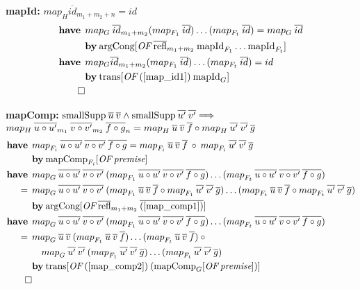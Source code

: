 \setcounter{mapId}{0}
\textbf{mapId:} $map_H \overline{id}_{m_1+m_2+n} = id$
\begin{align}
\textbf{have}\:\: & map_G \: \overline{id}_{m_1+m_2} (map_{F_1} \: \overline{id}) \dots (map_{F_t} \: \overline{id}) = map_G \: \overline{id} \label{map_id1} \\*
 & \textbf{by}\: \text{argCong}[\textit{OF} \: \overline{\text{refl}}_{m_1+m_2} \: \text{mapId}_{F_1} \dots \text{mapId}_{F_t}] \nonumber \\
\textbf{have}\:\: & map_G \overline{id}_{m_1+m_2} (map_{F_1} \: \overline{id}) \dots (map_{F_t} \: \overline{id}) = id \\*
& \textbf{by}\: \text{trans}[\textit{OF} \: (\ref{map_id1}) \: \text{mapId}_G] \nonumber \\*
\qed \nonumber
\end{align}

\textbf{mapComp:} $\text{smallSupp} \: \overline{u} \: \overline{v} \wedge \text{smallSupp} \: \overline{u'} \: \overline{v'} \Longrightarrow$ \\
\hspace*{1.7em} $map_H \: \overline{u \circ u'}_{m_1} \: \overline{v \circ v'}_{m_2} \: \overline{f \circ g}_n = {map}_{H} \: \overline{u} \: \overline{v} \: \overline{f} \circ {map}_{H} \: \overline{u'} \: \overline{v'} \: \overline{g}$
\begin{align}
\have & \map{F_i}{u \circ u'}{v \circ v'}{f \circ g} = \map{F_i}{u}{v}{f} \: \circ \: \map{F_i}{u'}{v'}{g} \label{map_comp1} \\*
 & \by \OF{\text{mapComp}_{F_i}}{\textit{premise}} \nonumber \\
%
\have & \map{G}{u \circ u'}{v \circ v'}{}(\map{F_1}{u \circ u'}{v \circ v'}{f \circ g})\dots(\map{F_t}{u \circ u'}{v \circ v'}{f \circ g}) \nonumber \\*
= \:\: & \map{G}{u \circ u'}{v \circ v'}{}(\map{F_1}{u}{v}{f} \circ \map{F_1}{u'}{v'}{g})\dots(\map{F_t}{u}{v}{f} \circ \map{F_t}{u'}{v'}{g}) \label{map_comp2} \\*
& \by \OF{\text{argCong}}{\overline{\text{refl}}_{m_1+m_2} \: \overline{(\ref{map_comp1})}} \nonumber \\
%
\have & \map{G}{u \circ u'}{v \circ v'}{}(\map{F_1}{u \circ u'}{v \circ v'}{f \circ g})\dots(\map{F_t}{u \circ u'}{v \circ v'}{f \circ g}) \nonumber \\*
= \:\: & \map{G}{u}{v}{}(\map{F_1}{u}{v}{f})\dots(\map{F_t}{u}{v}{f}) \: \circ \nonumber \\*
& \quad \map{G}{u'}{v'}{}(\map{F_1}{u'}{v'}{g})\dots(\map{F_t}{u'}{v'}{g}) \label{map_comp3} \\*
& \by \OF{\text{trans}}{(\ref{map_comp2}) \: (\OF{\text{mapComp}_G}{\textit{premise}})} \nonumber \\*
\qed \nonumber
\end{align}

